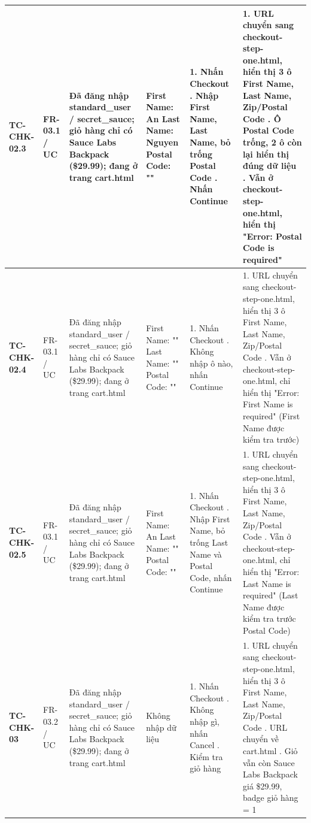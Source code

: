 {\begin{longtable}{|L{3.5cm}|L{1.9cm}|L{4.6cm}|L{3.7cm}|L{5.1cm}|L{5.1cm}|}
\hline
\textbf{\mbox{TC-CHK-02.3}} & FR-03.1 / UC & Đã đăng nhập standard\_\allowbreak{}user / secret\_\allowbreak{}sauce; giỏ hàng chỉ có Sauce Labs Backpack (\$29.99); đang ở trang cart.html & First Name: An \newline Last Name: Nguyen \newline Postal Code: "" & 1. Nhấn Checkout . Nhập First Name, Last Name, bỏ trống Postal Code . Nhấn Continue & 1. URL chuyển sang checkout-step-one.html, hiển thị 3 ô First Name, Last Name, Zip/Postal Code . Ô Postal Code trống, 2 ô còn lại hiển thị đúng dữ liệu . Vẫn ở checkout-step-one.html, hiển thị "Error: Postal Code is required" \\
\hline
\textbf{\mbox{TC-CHK-02.4}} & FR-03.1 / UC & Đã đăng nhập standard\_\allowbreak{}user / secret\_\allowbreak{}sauce; giỏ hàng chỉ có Sauce Labs Backpack (\$29.99); đang ở trang cart.html & First Name: "" \newline Last Name: "" \newline Postal Code: "" & 1. Nhấn Checkout . Không nhập ô nào, nhấn Continue & 1. URL chuyển sang checkout-step-one.html, hiển thị 3 ô First Name, Last Name, Zip/Postal Code . Vẫn ở checkout-step-one.html, chỉ hiển thị "Error: First Name is required" (First Name được kiểm tra trước) \\
\hline
\textbf{\mbox{TC-CHK-02.5}} & FR-03.1 / UC & Đã đăng nhập standard\_\allowbreak{}user / secret\_\allowbreak{}sauce; giỏ hàng chỉ có Sauce Labs Backpack (\$29.99); đang ở trang cart.html & First Name: An \newline Last Name: "" \newline Postal Code: "" & 1. Nhấn Checkout . Nhập First Name, bỏ trống Last Name và Postal Code, nhấn Continue & 1. URL chuyển sang checkout-step-one.html, hiển thị 3 ô First Name, Last Name, Zip/Postal Code . Vẫn ở checkout-step-one.html, chỉ hiển thị "Error: Last Name is required" (Last Name được kiểm tra trước Postal Code) \\
\hline
\textbf{\mbox{TC-CHK-03}} & FR-03.2 / UC & Đã đăng nhập standard\_\allowbreak{}user / secret\_\allowbreak{}sauce; giỏ hàng chỉ có Sauce Labs Backpack (\$29.99); đang ở trang cart.html & Không nhập dữ liệu & 1. Nhấn Checkout . Không nhập gì, nhấn Cancel . Kiểm tra giỏ hàng & 1. URL chuyển sang checkout-step-one.html, hiển thị 3 ô First Name, Last Name, Zip/Postal Code . URL chuyển về cart.html . Giỏ vẫn còn Sauce Labs Backpack giá \$29.99, badge giỏ hàng = 1 \\

\end{longtable}}
